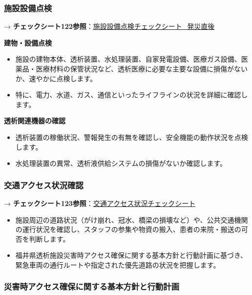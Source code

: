 \documentclass[
  japanese,
  letterpaper,
  DIV=11,
  numbers=noendperiod]{scrartcl}
\providecommand{\tightlist}{%
  \setlength{\itemsep}{0pt}\setlength{\parskip}{0pt}}
\begin{document}
\subsubsection{施設設備点検}\label{ux65bdux8a2dux8a2dux5099ux70b9ux691c}

→
\textbf{チェックシート122参照}：\href{1461_施設設備点検チェックシート_発災直後.qmd}{施設設備点検チェックシート\_発災直後}

\textbf{建物・設備点検}

\begin{itemize}
\tightlist
\item
  施設の建物本体、透析装置、水処理装置、自家発電設備、医療ガス設備、医薬品・医療材料の保管状況など、透析医療に必要な主要な設備に損傷がないか、速やかに点検します。
\item
  特に、電力、水道、ガス、通信といったライフラインの状況を詳細に確認します。
\end{itemize}

\textbf{透析関連機器の確認}

\begin{itemize}
\tightlist
\item
  透析装置の稼働状況、警報発生の有無を確認し、安全機能の動作状況を点検します。
\item
  水処理装置の異常、透析液供給システムの損傷がないか確認します。
\end{itemize}

\subsubsection{交通アクセス状況確認}\label{ux4ea4ux901aux30a2ux30afux30bbux30b9ux72b6ux6cc1ux78baux8a8d}

→
\textbf{チェックシート123参照}：\href{1470_交通アクセス状況チェックシート.qmd}{交通アクセス状況チェックシート}

\begin{itemize}
\tightlist
\item
  施設周辺の道路状況（がけ崩れ、冠水、橋梁の損壊など）や、公共交通機関の運行状況を確認し、スタッフの参集や物資の搬入、患者の来院・搬送の可否を判断します。
\item
  福井県透析施設災害時アクセス確保に関する基本方針と行動計画に基づき、緊急車両の通行ルートや指定された優先道路の状況を把握します。
\end{itemize}

\subsubsection{災害時アクセス確保に関する基本方針と行動計画}\label{ux707dux5bb3ux6642ux30a2ux30afux30bbux30b9ux78baux4fddux306bux95a2ux3059ux308bux57faux672cux65b9ux91ddux3068ux884cux52d5ux8a08ux753b}
\end{document}
